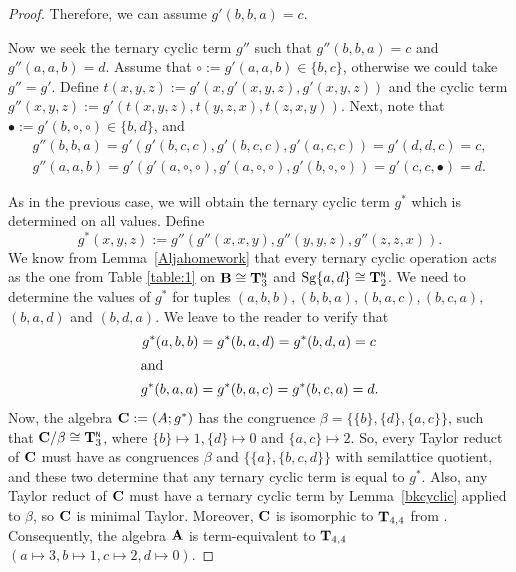 \documentclass[11pt]{amsart}
\newcommand{\m}[1]{\mathbf{\uppercase{#1}}}
\newcommand{\n}{\scriptscriptstyle{\mathsf{N}}}
\theoremstyle{definition}
\theoremstyle{remark}
\theoremstyle{plain}
\begin{document}
\begin{proof}
Therefore, we can assume $g'(b,b,a)=c$. 
 
Now we seek the ternary cyclic term $g''$ such that $g''(b,b,a)=c$ and $g''(a,a,b)=d$. Assume that $\circ:=g'(a,a,b)\in \{b,c\}$, otherwise we could take $g''=g'$. Define $t(x,y,z):=g'(x,g'(x,y,z),g'(x,y,z))$ and the cyclic term $g''(x,y,z):=g'(t(x,y,z),t(y,z,x),t(z,x,y)).$ Next, note that $\bullet:=g'(b,\circ,\circ)\in \{b,d\}$, and
\begin{align*}
g''(b,b,a)=g'(g'(b,c,c),g'(b,c,c),g'(a,c,c))=g'(d,d,c)=c,\\
g''(a,a,b)=g'(g'(a,\circ,\circ),g'(a,\circ,\circ),g'(b,\circ,\circ))=g'(c,c,\bullet)=d.
\end{align*}

 
As in the previous case, we will obtain the ternary cyclic term $g^*$ which is determined on all values. Define
$$g^*(x,y,z):=g''(g''(x,x,y),g''(y,y,z),g''(z,z,x)).$$
We know from Lemma~\ref{Aljahomework} that every ternary cyclic operation acts as the one from Table \ref{table:1} on $\m b\cong {\m T}_3^{\n}$ and $\mathrm{Sg}\{a,d\}\cong{\m T}_2^{\n}$. We need to determine the values of $g^*$ for tuples $(a,b,b), (b,b,a), (b,a,c), (b,c,a),$ $(b,a,d)$ and $(b,d,a)$. We leave to the reader to verify that
\begin{align*}
     g^*(a,b,b)&=g^*(b,a,d)=g^*(b,d,a)=c\\
     \shortintertext{and}
     g^*(b,a,a)&=g^*(b,a,c)=g^*(b,c,a)=d.
\end{align*}
Now, the algebra $\m c:=(A;g^*)$ has the congruence $\beta=\{\{b\},\{d\},\{a,c\}\}$, such that ${\m c}/\beta\cong {\m T}_3^{\n}$, where $\{b\}\mapsto 1, \{d\}\mapsto 0$ and $\{a,c\}\mapsto 2$. So, every Taylor reduct of $\m c$ must have as congruences $\beta$ and $\{\{a\},\{b,c,d\}\}$ with semilattice quotient, and these two determine that any ternary cyclic term is equal to $g^*$. Also, any Taylor reduct of $\m c$ must have a ternary cyclic term by Lemma~\ref{bkcyclic} applied to $\beta$, so $\m c$ is minimal Taylor. Moreover, $\m c$ is isomorphic to ${\m T}_{4,4}$ from . Consequently, the algebra $\m A$ is term-equivalent to ${\m T}_{4,4}$ $(a\mapsto 3, b\mapsto 1, c\mapsto 2, d\mapsto 0)$.
\end{proof}
\end{document}
